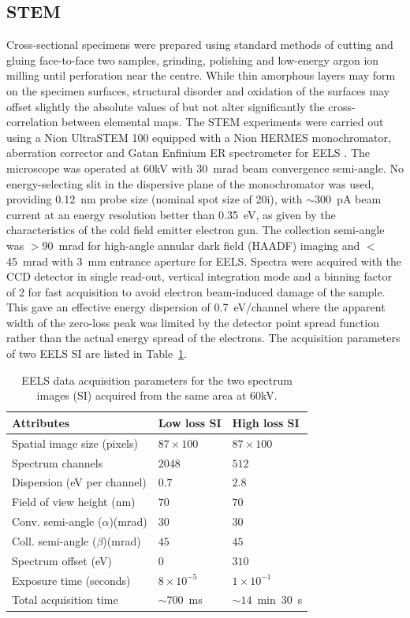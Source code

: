 \documentclass[%
aip,
rsi,%
 amsmath,amssymb,%
 reprint,%
]{revtex4-1}
\begin{document}
\subsection{STEM}
\label{sec:STEM}
Cross-sectional specimens were prepared using standard methods of cutting and gluing face-to-face two samples, grinding, polishing and low-energy argon ion milling until perforation near the centre. While thin amorphous  layers may form on the specimen surfaces, structural disorder and oxidation of the surfaces may offset slightly the absolute values of but not alter significantly the cross-correlation between elemental maps. The STEM experiments were carried out using a Nion UltraSTEM 100 equipped with a Nion HERMES monochromator, aberration corrector and Gatan Enfinium ER spectrometer for EELS \cite{Krivanek2013,Krivanek2015}. The microscope was operated at 60kV with 30~mrad beam convergence semi-angle. No energy-selecting slit in the dispersive plane of the monochromator was used, providing  0.12~nm probe size (nominal spot size of 20i), with $\sim$300~pA beam current at an energy resolution better than 0.35~eV, as given by the characteristics of the cold field emitter electron gun. The collection semi-angle was $>$90~mrad for high-angle annular dark field (HAADF) imaging and $<$45~mrad with 3~mm entrance aperture for EELS. Spectra were acquired with the CCD detector in single read-out, vertical integration mode and a binning factor of 2 for fast acquisition to avoid electron beam-induced damage of the sample. This gave an effective energy dispersion of 0.7~eV/channel where the apparent width of the zero-loss peak was limited by the detector point spread function rather than the actual energy spread of the electrons. The acquisition parameters of two EELS SI are listed in Table~\ref{tab:Attributes}.
\begin{table}%
	\caption{EELS data acquisition parameters for the two spectrum images (SI) acquired from the same area at $60$kV.}
    \label{tab:Attributes}
	\begin{ruledtabular}
		\begin{tabular}{lll}
			Attributes&Low loss SI&High loss SI							\\ \hline
			Spatial image size (pixels)&$87\times100$&$87\times100$ 	\\
            Spectrum channels		&$2048$&$512$						\\
			Dispersion (eV per channel)&$0.7$&$2.8$						\\
			Field of view height (nm) &$70$&$70$						\\
			Conv. semi-angle ($\alpha$)(mrad)&$30$&$30$					\\
			Coll. semi-angle ($\beta$)(mrad)&$45$&$45$					\\
			Spectrum offset (eV)&$0$&$310$								\\
			Exposure time (seconds)&$8\times10^{-5}$&$1\times10^{-1}$	\\
			Total acquisition time &$\sim700$~ms&$\sim14$~min~$30$~s
		\end{tabular}
	\end{ruledtabular}
\end{table}
\end{document}
